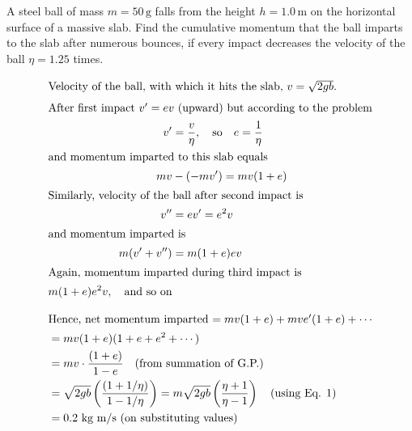 \item A steel ball of mass $m = 50 \, \text{g}$ falls from the height $h = 1.0 \, \text{m}$ on the horizontal surface of a massive slab. Find the cumulative momentum that the ball imparts to the slab after numerous bounces, if every impact decreases the velocity of the ball $\eta = 1.25$ times.\begin{solution}
    \begin{center}
    \end{center}
    
    \begin{align*}
        \intertext{Velocity of the ball, with which it hits the slab, \( v = \sqrt{2 gb} \).}
        \intertext{After first impact \( v' = ev \) (upward) but according to the problem}
        v' &= \dfrac{v}{\eta}, \quad \text{so} \quad e = \dfrac{1}{\eta}\\
        \intertext{and momentum imparted to this slab equals}
        mv &- (-mv') = mv (1 + e)\\
        \intertext{Similarly, velocity of the ball after second impact is}
        v'' &= ev' = e^2 v\\
        \intertext{and momentum imparted is}
        m(v' + v'') &= m(1 + e)ev\\
        \intertext{Again, momentum imparted during third impact is}
        m (1 + e)e^2v, \quad \text{and so on}
    \end{align*}
    
    \begin{align*}
        \intertext{Hence, net momentum imparted \(= mv (1 + e) + mve' (1 + e) + \cdots \)}
        &= mv(1 + e) (1 + e + e^2 + \cdots)\\
        &= mv \cdot \dfrac{(1+e)}{1 - e} \quad \text{(from summation of G.P.)}\\
        &= \sqrt{2 gb} \left( \dfrac{(1+1/\eta)}{1-1/\eta} \right)=m\sqrt{2 gb} \left( \dfrac{\eta + 1}{\eta - 1} \right) \quad \text{(using Eq. 1)}\\
        &= 0.2 \text{ kg m/s (on substituting values)}
    \end{align*}
\end{solution}